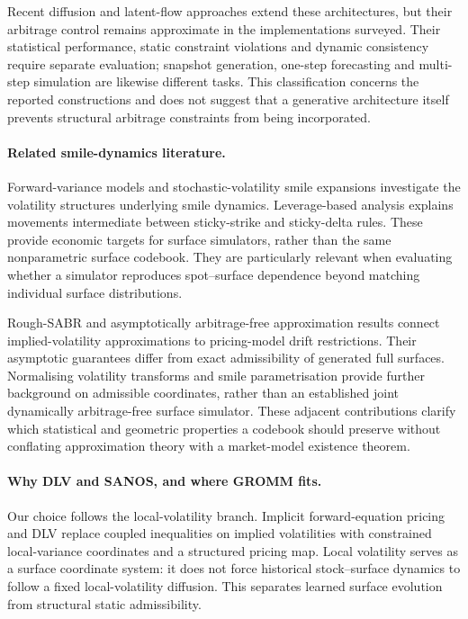 Recent diffusion and latent-flow approaches \cite{jin,brooks,hao,han,yang} extend these architectures, but their arbitrage control remains approximate in the implementations surveyed. Their statistical performance, static constraint violations and dynamic consistency require separate evaluation; snapshot generation, one-step forecasting and multi-step simulation are likewise different tasks. This classification concerns the reported constructions and does not suggest that a generative architecture itself prevents structural arbitrage constraints from being incorporated.

\paragraph{Related smile-dynamics literature.}
Forward-variance models \cite{bergomi2,bergomi3} and stochastic-volatility smile expansions \cite{bergomiguyon} investigate the volatility structures underlying smile dynamics. Leverage-based analysis \cite{bouchaud} explains movements intermediate between sticky-strike and sticky-delta rules. These provide economic targets for surface simulators, rather than the same nonparametric surface codebook. They are particularly relevant when evaluating whether a simulator reproduces spot--surface dependence beyond matching individual surface distributions.

Rough-SABR and asymptotically arbitrage-free approximation results \cite{fukasawagatheral,fukasawa} connect implied-volatility approximations to pricing-model drift restrictions. Their asymptotic guarantees differ from exact admissibility of generated full surfaces. Normalising volatility transforms and smile parametrisation \cite{lucic} provide further background on admissible coordinates, rather than an established joint dynamically arbitrage-free surface simulator. These adjacent contributions clarify which statistical and geometric properties a codebook should preserve without conflating approximation theory with a market-model existence theorem.

\paragraph{Why DLV and SANOS, and where GROMM fits.}
Our choice follows the local-volatility branch. Implicit forward-equation pricing \cite{ah} and DLV \cite{dlv} replace coupled inequalities on implied volatilities with constrained local-variance coordinates and a structured pricing map. Local volatility serves as a surface coordinate system: it does not force historical stock--surface dynamics to follow a fixed local-volatility diffusion. This separates learned surface evolution from structural static admissibility.

